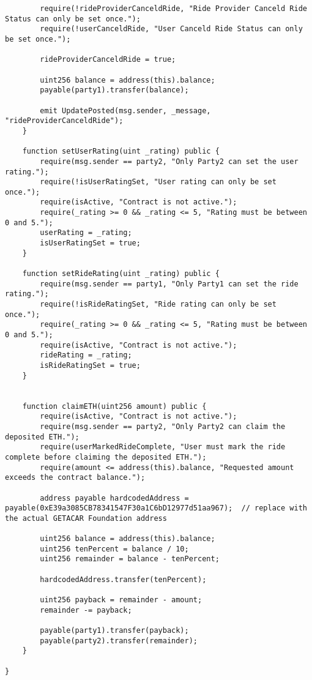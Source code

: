\begin{lstlisting}
        require(!rideProviderCanceldRide, "Ride Provider Canceld Ride Status can only be set once.");
        require(!userCanceldRide, "User Canceld Ride Status can only be set once.");

        rideProviderCanceldRide = true;

        uint256 balance = address(this).balance;
        payable(party1).transfer(balance);
        
        emit UpdatePosted(msg.sender, _message, "rideProviderCanceldRide");
    }

    function setUserRating(uint _rating) public {
        require(msg.sender == party2, "Only Party2 can set the user rating.");
        require(!isUserRatingSet, "User rating can only be set once.");
        require(isActive, "Contract is not active.");
        require(_rating >= 0 && _rating <= 5, "Rating must be between 0 and 5.");
        userRating = _rating;
        isUserRatingSet = true;
    }

    function setRideRating(uint _rating) public {
        require(msg.sender == party1, "Only Party1 can set the ride rating.");
        require(!isRideRatingSet, "Ride rating can only be set once.");
        require(_rating >= 0 && _rating <= 5, "Rating must be between 0 and 5.");
        require(isActive, "Contract is not active.");
        rideRating = _rating;
        isRideRatingSet = true;
    }


    function claimETH(uint256 amount) public {
        require(isActive, "Contract is not active.");
        require(msg.sender == party2, "Only Party2 can claim the deposited ETH.");
        require(userMarkedRideComplete, "User must mark the ride complete before claiming the deposited ETH.");
        require(amount <= address(this).balance, "Requested amount exceeds the contract balance.");
        
        address payable hardcodedAddress = payable(0xE39a3085CB78341547F30a1C6bD12977d51aa967);  // replace with the actual GETACAR Foundation address

        uint256 balance = address(this).balance;
        uint256 tenPercent = balance / 10;
        uint256 remainder = balance - tenPercent;

        hardcodedAddress.transfer(tenPercent);

        uint256 payback = remainder - amount;
        remainder -= payback;

        payable(party1).transfer(payback);
        payable(party2).transfer(remainder);
    }

}
\end{lstlisting}